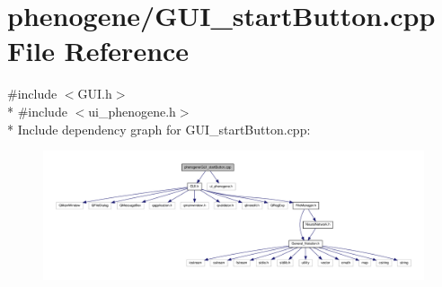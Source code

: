 \hypertarget{a00012}{\section{phenogene/\-G\-U\-I\-\_\-start\-Button.cpp File Reference}
\label{df/d86/a00012}
}
{\ttfamily \#include $<$G\-U\-I.\-h$>$}\\*
{\ttfamily \#include $<$ui\-\_\-phenogene.\-h$>$}\\*
Include dependency graph for G\-U\-I\-\_\-start\-Button.\-cpp\-:
\nopagebreak
\begin{figure}[H]
\begin{center}
\leavevmode
\includegraphics[width=350pt]{dc/d87/a00032}
\end{center}
\end{figure}
